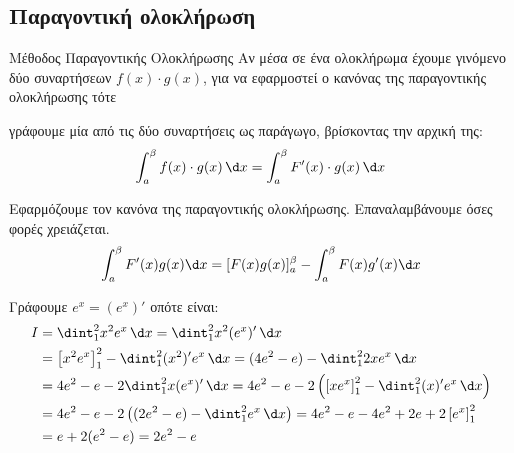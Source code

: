 \subsection{Παραγοντική ολοκλήρωση}
\begin{askhsh}{Μέθοδος Παραγοντικής Ολοκλήρωσης}
Αν μέσα σε ένα ολοκλήρωμα έχουμε γινόμενο δύο συναρτήσεων $f(x)\cdot g(x)$, για να εφαρμοστεί ο κανόνας της παραγοντικής ολοκλήρωσης τότε

\bhmata
\begin{bhma}
\item γράφουμε μία από τις δύο συναρτήσεις ως παράγωγο, βρίσκοντας την αρχική της:
\[\int_{a}^{\beta}{f(x)\cdot g(x)\, \d x}=\int_{a}^{\beta}{F'(x)\cdot g(x)\, \d x}\]
\item Εφαρμόζουμε τον κανόνα της παραγοντικής ολοκλήρωσης. Επαναλαμβάνουμε όσες φορές χρειάζεται.
\[\int_{a}^{\beta}{F'(x)g(x)\d x}=[F(x)g(x)]_a^\beta-\int_{a}^{\beta}{F(x)g'(x)\d x}\]
\end{bhma}
\end{askhsh}
\lysh
Γράφουμε $e^x = (e^x)'$ οπότε είναι:
\begin{align*}
I &= \dint_{1}^{2}{x^2e^x\, \d x} = \dint_{1}^{2}{x^2(e^x)'\, \d x} \\
&= \left[x^2e^x\right]_1^2 - \dint_{1}^{2}{(x^2)'e^x\, \d x} = (4e^2 - e) - \dint_{1}^{2}{2xe^x\, \d x} \\
&= 4e^2 - e - 2\dint_{1}^{2}{x(e^x)'\, \d x} = 4e^2 - e - 2\left( \left[xe^x\right]_1^2 - \dint_{1}^{2}{(x)'e^x\, \d x} \right) \\
&= 4e^2 - e - 2\left( (2e^2 - e) - \dint_{1}^{2}{e^x\, \d x} \right) = 4e^2 - e - 4e^2 + 2e + 2\left[e^x\right]_1^2 \\
&= e + 2(e^2 - e) = 2e^2 - e
\end{align*}

